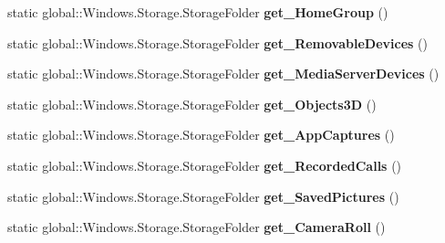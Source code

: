 \begin{DoxyCompactItemize}
\mbox{\label{class_windows_1_1_storage_1_1_known_folders_afaf43060342706d67a7a25a467545948}} 
static global\+::\+Windows.\+Storage.\+Storage\+Folder {\bfseries get\+\_\+\+Home\+Group} ()
\item 
\mbox{\label{class_windows_1_1_storage_1_1_known_folders_a7d4f37e230205c7d410066952eeac000}} 
static global\+::\+Windows.\+Storage.\+Storage\+Folder {\bfseries get\+\_\+\+Removable\+Devices} ()
\item 
\mbox{\label{class_windows_1_1_storage_1_1_known_folders_afd2c3f741c42f2f472afa0f33c0a19c6}} 
static global\+::\+Windows.\+Storage.\+Storage\+Folder {\bfseries get\+\_\+\+Media\+Server\+Devices} ()
\item 
\mbox{\label{class_windows_1_1_storage_1_1_known_folders_a7538b526a7c946e575ca80ffce8b9c64}} 
static global\+::\+Windows.\+Storage.\+Storage\+Folder {\bfseries get\+\_\+\+Objects3D} ()
\item 
\mbox{\label{class_windows_1_1_storage_1_1_known_folders_ab66696615f1c71c5ee62274cc6643a89}} 
static global\+::\+Windows.\+Storage.\+Storage\+Folder {\bfseries get\+\_\+\+App\+Captures} ()
\item 
\mbox{\label{class_windows_1_1_storage_1_1_known_folders_a02949a31d02148e80a3afd3aed34960d}} 
static global\+::\+Windows.\+Storage.\+Storage\+Folder {\bfseries get\+\_\+\+Recorded\+Calls} ()
\item 
\mbox{\label{class_windows_1_1_storage_1_1_known_folders_a4869671672489dd57931f6074817a15c}} 
static global\+::\+Windows.\+Storage.\+Storage\+Folder {\bfseries get\+\_\+\+Saved\+Pictures} ()
\item 
\mbox{\label{class_windows_1_1_storage_1_1_known_folders_a4e8edc457f8a28894740a09fc5dbe161}} 
static global\+::\+Windows.\+Storage.\+Storage\+Folder {\bfseries get\+\_\+\+Camera\+Roll} ()
\item 

\end{DoxyCompactItemize}
